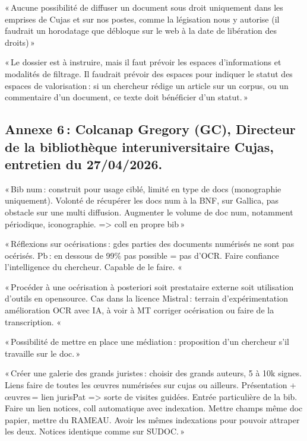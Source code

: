 « Aucune possibilité de diffuser un document sous droit uniquement dans les emprises de Cujas et sur nos postes, comme la légisation nous y autorise (il faudrait un horodatage que débloque sur le web à la date de libération des droits) » 

« Le dossier est à instruire, mais il faut prévoir les espaces d’informations et modalités de filtrage. Il faudrait prévoir des espaces pour indiquer le statut des espaces de valorisation : si un chercheur rédige un article sur un corpus, ou un commentaire d’un document, ce texte doit bénéficier d’un statut. » 



\subsection*{Annexe 6 : Colcanap Gregory (GC), Directeur de la bibliothèque interuniversitaire Cujas, entretien du 27/04/2026.} 


« Bib num : construit pour usage ciblé, limité en type de docs (monographie uniquement). Volonté de récupérer les docs num à la BNF, sur Gallica, pas obstacle sur une multi diffusion. Augmenter le volume de doc num, notamment périodique, iconographie. => coll en propre bib » 

« Réflexions sur océrisations : gdes parties des documents numérisés ne sont pas océrisés. Pb : en dessous de 99\% pas possible = pas d’OCR. Faire confiance l’intelligence du chercheur. Capable de le faire. «  

« Procéder à une océrisation à posteriori soit prestataire externe soit utilisation d’outils en opensource. Cas dans la licence Mistral : terrain d’expérimentation amélioration OCR avec IA, à voir à MT corriger océrisation ou faire de la transcription. «  

« Possibilité de mettre en place une médiation : proposition d’un chercheur s’il travaille sur le doc. » 

« Créer une galerie des grands juristes : choisir des grands auteurs, 5 à 10k signes. Liens faire de toutes les œuvres numérisées sur cujas ou ailleurs. Présentation + œuvres = lien jurisPat => sorte de visites guidées. Entrée particulière de la bib. Faire un lien notices, coll automatique avec indexation. Mettre champs même doc papier, mettre du RAMEAU. Avoir les mêmes indexations pour pouvoir attraper les deux. Notices identique comme sur SUDOC. » 

